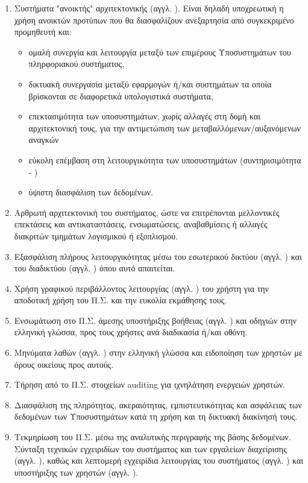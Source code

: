 \documentclass{assignment}
\begin{document}
\begin{enumerate}
\item Συστήματα "ανοικτής" αρχιτεκτονικής (αγγλ. ). Είναι δηλαδή υποχρεωτική η χρήση ανοικτών προτύπων που θα διασφαλίζουν ανεξαρτησία από συγκεκριμένο προμηθευτή και:

  \begin{itemize}
    \item ομαλή συνεργία και λειτουργία μεταξύ των επιμέρους Υποσυστημάτων του πληρφοριακού συστήματος,
    \item δικτυακή συνεργασία μεταξύ εφαρμογών ή/και συστημάτων τα οποία βρίσκονται σε διαφορετικά υπολογιστικά συστήματα,
    \item επεκτασιμότητα των υποσυστημάτων, χωρίς αλλαγές στη δομή και αρχιτεκτονική τους, για την αντιμετώπιση των μεταβαλλόμενων/αυξανόμενων αναγκών
    \item εύκολη επέμβαση στη λειτουργικότητα των υποσυστημάτων (συντηρισιμότητα - )
    \item ύψιστη διασφάλιση των δεδομένων.
  \end{itemize}

\item Αρθρωτή αρχιτεκτονική του συστήματος, ώστε να επιτρέπονται μελλοντικές επεκτάσεις και αντικαταστάσεις, ενσωματώσεις, αναβαθμίσεις ή αλλαγές διακριτών τμημάτων λογισμικού ή εξοπλισμού.

\item Εξασφάλιση πλήρους λειτουργικότητας μέσω του εσωτερικού δικτύου (αγγλ. ) και του διαδικτύου (αγγλ. ) όπου αυτό απαιτείται.

\item Χρήση γραφικού περιβάλλοντος λειτουργίας (αγγλ. ) του χρήστη για την αποδοτική χρήση του Π.Σ. και την ευκολία εκμάθησης τους.

\item Ενσωμάτωση στο Π.Σ. άμεσης υποστήριξης βοήθειας (αγγλ. ) και οδηγιών στην ελληνική γλώσσα, προς τους χρήστες ανά διαδικασία ή/και οθόνη.

\item Μηνύματα λαθών (αγγλ. ) στην ελληνική γλώσσα και ειδοποίηση των χρηστών με όρους οικείους προς αυτούς.

\item Tήρηση από το Π.Σ. στοιχείων auditing για ιχνηλάτηση
ενεργειών χρηστών.

\item Διασφάλιση της πληρότητας, ακεραιότητας, εμπιστευτικότητας και ασφάλειας των δεδομένων των Υποσυστημάτων κατά τη χρήση και τη δικτυακή διακίνησή τους.

\item Τεκμηρίωση του Π.Σ. μέσω της αναλυτικής περιγραφής της βάσης δεδομένων. Σύνταξη τεχνικών εγχειριδίων του συστήματος και των εργαλείων διαχείρισης (αγγλ. ), καθώς και λεπτομερή εγχειρίδια λειτουργίας του συστήματος (αγγλ.  ) και υποστήριξης των χρηστών (αγγλ. ).

\end{enumerate}
\end{document}
